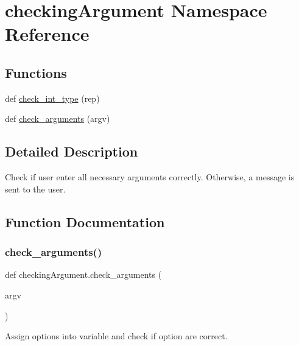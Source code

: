 \hypertarget{namespacecheckingArgument}{}\section{checking\+Argument Namespace Reference}
\label{namespacecheckingArgument}
\subsection*{Functions}
\begin{DoxyCompactItemize}
\item 
def \hyperlink{namespacecheckingArgument_a1d9eb47180088481295bcbe4edb1d3e9}{check\+\_\+int\+\_\+type} (rep)
\item 
def \hyperlink{namespacecheckingArgument_a5c2a1e659d8c6bad279afc69226c8077}{check\+\_\+arguments} (argv)
\end{DoxyCompactItemize}


\subsection{Detailed Description}
\begin{DoxyVerb}    Check if user enter all necessary arguments correctly.
    Otherwise, a message is sent to the user.
\end{DoxyVerb}
 

\subsection{Function Documentation}
\mbox{\label{namespacecheckingArgument_a5c2a1e659d8c6bad279afc69226c8077}} 
\subsubsection{\texorpdfstring{check\+\_\+arguments()}{check\_arguments()}}
{\footnotesize\ttfamily def checking\+Argument.\+check\+\_\+arguments (\begin{DoxyParamCaption}\item[{}]{argv }\end{DoxyParamCaption})}

\begin{DoxyVerb}Assign options into variable and check if
    option are correct.
\end{DoxyVerb}
 \mbox{\label{namespacecheckingArgument_a1d9eb47180088481295bcbe4edb1d3e9}} 
